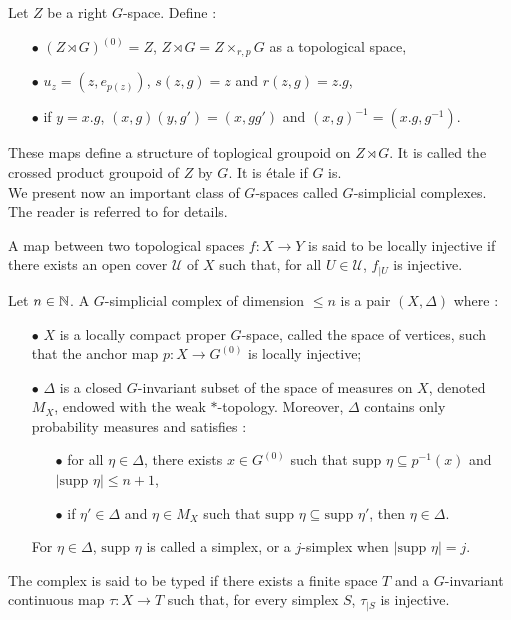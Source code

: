 Let $Z$ be a right $G$-space. Define :
\begin{itemize}
\item[$\bullet$] $(Z\rtimes G)^{(0)} = Z$, $Z\rtimes G = Z\times_{r,p} G$ as a topological space,
\item[$\bullet$] $u_{z}= (z,e_{p(z)})$, $ s(z,g) = z$ and $r(z,g)=z.g$, 
\item[$\bullet$] if $y = x.g$, $(x,g)(y,g')= (x,gg') $ and $(x,g)^{-1} = (x.g,g^{-1})$.
\end{itemize}

These maps define a structure of toplogical groupoid on $Z\rtimes G$. It is called the crossed product groupoid of $Z$ by $G$. It is étale if $G$ is.\\

We present now an important class of $G$-spaces called $G$-simplicial complexes. The reader is referred to \cite{TuBC2} for details. 

\begin{definition}
A map between two topological spaces $f : X\rightarrow Y$ is said to be locally injective if there exists an open cover $\mathcal U$ of $X$ such that, for all $U\in \mathcal U$, $f_{|U}$ is injective.
\end{definition}

\begin{definition} \label{Gcomplex}
Let $n\in\mathbb N$. A $G$-simplicial complex of dimension $\leq n$ is a pair $(X,\Delta)$ where :
\begin{itemize}
\item[$\bullet$] $X$ is a locally compact proper $G$-space, called the space of vertices, such that the anchor map $p : X\rightarrow G^{(0)}$ is locally injective;
\item[$\bullet$] $\Delta$ is a closed $G$-invariant subset of the space of measures on $X$, denoted $M_X$, endowed with the weak $*$-topology. Moreover, $\Delta$ contains only probability measures and satisfies :
\begin{itemize}
\item[$\bullet$] for all $\eta\in\Delta$, there exists $x\in G^ {(0)}$ such that $\text{supp }\eta \subseteq p^{-1}(x)$ and $|\text{supp }\eta|\leq n+1$,
\item[$\bullet$] if $\eta' \in \Delta$ and $\eta\in M_X$ such that $\text{supp }\eta \subseteq \text{supp }\eta'$, then $\eta\in \Delta$.
\end{itemize}
For $\eta\in \Delta$, $\text{supp }\eta$ is called a simplex, or a $j$-simplex when $|\text{supp }\eta | = j$.
\end{itemize}
The complex is said to be typed if there exists a finite space $T$ and a $G$-invariant continuous map $\tau : X\rightarrow T$ such that, for every simplex $S$, $\tau_{|S}$ is injective.  
\end{definition}

